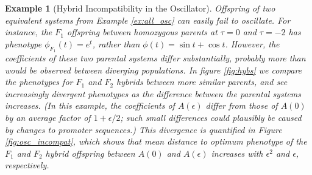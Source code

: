 \documentclass{article}
\newcommand{\1}{\mathbbm{1}}
\newcommand{\Sys}{\mathcal{S}}
\newtheorem{example}{Example}
\begin{document}
\begin{example}[Hybrid Incompatibility in the Oscillator] \label{ex:hybrid_osc}
Offspring of two equivalent systems from Example \ref{ex:all_osc}
can easily fail to oscillate.
For instance, the $F_1$ offspring between homozygous parents at $\tau=0$ and $\tau=-2$
has phenotype $\phi_{F_1}(t) = e^t$, rather than $\phi(t) = \sin t + \cos t$.
However, the coefficients of these two parental systems differ substantially,
probably more than would be observed between diverging populations.
In figure \ref{fig:hybs} we compare the phenotypes for $F_1$ and $F_2$ hybrids between more similar parents,
and see increasingly divergent phenotypes as the difference between the parental systems increases.
(In this example, the coefficients of $A(\epsilon)$ differ from those of $A(0)$ by an average factor of $1+\epsilon/2$;
such small differences could plausibly be caused by changes to promoter sequences.)
This divergence is quantified in Figure \ref{fig:osc_incompat},
which shows that mean distance to optimum phenotype of the $F_1$ and $F_2$ hybrid offspring between $A(0)$ and $A(\epsilon)$
increases with $\epsilon^2$ and $\epsilon$, respectively.





\end{example}
\end{document}
